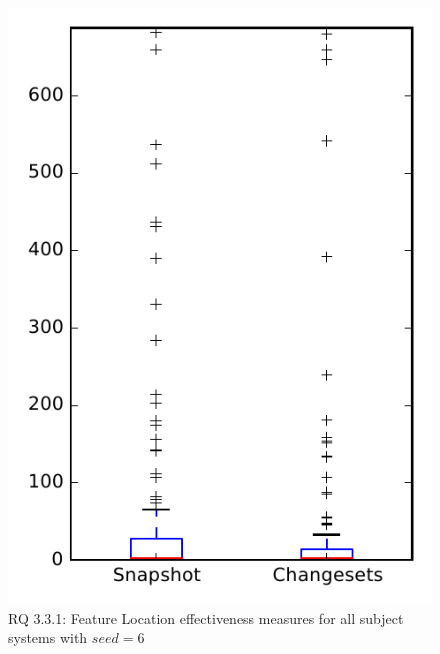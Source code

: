 
\begin{figure}
\centering
\includegraphics[height=0.4\textheight]{figures/flt_seed/rq1_overview_6}
\caption{RQ 3.3.1: Feature Location effectiveness measures for all subject systems with $seed=6$}
\label{fig:flt_seed:rq1:overview}
\end{figure}
